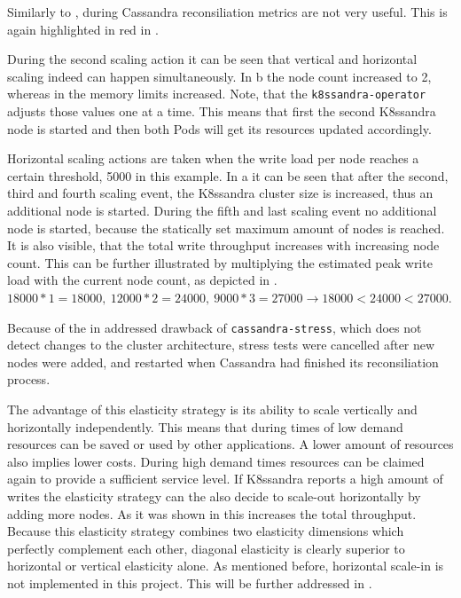 Similarly to , during Cassandra reconsiliation metrics are not very useful. This is again highlighted in red in .

During the second scaling action it can be seen that vertical and horizontal scaling indeed can happen simultaneously. In b the node count increased to 2, whereas in  the memory limits increased. Note, that the \texttt{k8ssandra-operator} adjusts those values one at a time. This means that first the second K8ssandra node is started and then both Pods will get its resources updated accordingly.

Horizontal scaling actions are taken when the write load per node reaches a certain threshold, 5000 in this example. In a it can be seen that after the second, third and fourth scaling event, the K8ssandra cluster size is increased, thus an additional node is started. During the fifth and last scaling event no additional node is started, because the statically set maximum amount of nodes is reached. It is also visible, that the total write throughput increases with increasing node count. This can be further illustrated by multiplying the estimated peak write load with the current node count, as depicted in . \(18000 * 1 = 18000,\ 12000 * 2 = 24000,\ 9000 * 3 = 27000 \rightarrow 18000 < 24000 < 27000\).

Because of the in  addressed drawback of \texttt{cassandra-stress}, which does not detect changes to the cluster architecture, stress tests were cancelled after new nodes were added, and restarted when Cassandra had finished its reconsiliation process.

The advantage of this elasticity strategy is its ability to scale vertically and horizontally independently. This means that during times of low demand resources can be saved or used by other applications. A lower amount of resources also implies lower costs. During high demand times resources can be claimed again to provide a sufficient service level. If K8ssandra reports a high amount of writes the elasticity strategy can the also decide to scale-out horizontally by adding more nodes. As it was shown in  this increases the total throughput. Because this elasticity strategy combines two elasticity dimensions which perfectly complement each other, diagonal elasticity is clearly superior to horizontal or vertical elasticity alone. As mentioned before, horizontal scale-in is not implemented in this project. This will be further addressed in .

